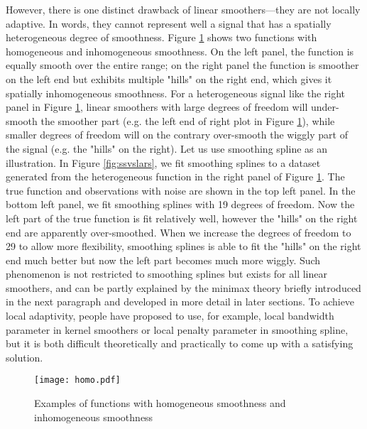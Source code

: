 \documentclass[a4paper]{article}
\begin{document}
However, there is one distinct drawback of linear smoothers---they are not locally adaptive. In words, they cannot represent well a signal that has a spatially heterogeneous degree of smoothness. Figure \ref{fig:homo} shows two functions with homogeneous and inhomogeneous smoothness. On the left panel, the function is equally smooth over the entire range; on the right panel the function is smoother on the left end but exhibits multiple "hills" on the right end, which gives it spatially inhomogeneous smoothness. For a heterogeneous signal like the right panel in Figure \ref{fig:homo}, linear smoothers with large degrees of freedom will under-smooth the smoother part (e.g. the left end of right plot in Figure \ref{fig:homo}), while smaller degrees of freedom will on the contrary over-smooth the wiggly part of the signal (e.g. the "hills" on the right). Let us use smoothing spline as an illustration. In Figure \ref{fig:ssvslars}, we fit smoothing splines to a dataset generated from the heterogeneous function in the right panel of Figure \ref{fig:homo}. The true function and observations with noise are shown in the top left panel. In the bottom left panel, we fit smoothing splines with 19 degrees of freedom. Now the left part of the true function is fit relatively well, however the "hills" on the right end are apparently over-smoothed. When we increase the degrees of freedom to 29 to allow more flexibility, smoothing splines is able to fit the "hills" on the right end much better but now the left part becomes much more wiggly. Such phenomenon is not restricted to smoothing splines but exists for all linear smoothers, and can be partly explained by the minimax theory briefly introduced in the next paragraph and developed in more detail in later sections. To achieve local adaptivity, people have proposed to use, for example, local bandwidth parameter in kernel smoothers or local penalty parameter in smoothing spline, but it is both difficult theoretically and practically to come up with a satisfying solution.

\begin{figure}[t!]
\centering
\texttt{[image: homo.pdf]}
\caption{Examples of functions with homogeneous smoothness and inhomogeneous smoothness}
\label{fig:homo}
\end{figure}
\end{document}
